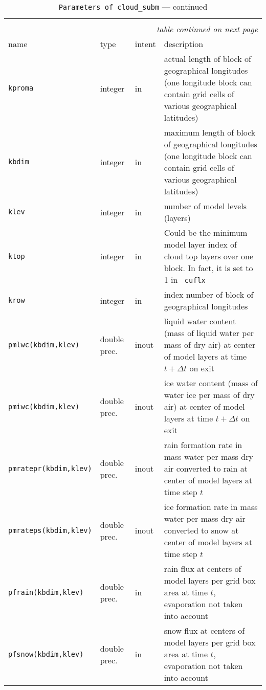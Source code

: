 \begin{longtable}{l@{\extracolsep\fill}llp{7.0cm}}
\hline\hline\caption[Parameters of {\tt cloud\_subm}]{Parameter list
  of arguments passed to {\tt cloud\_subm}}\\\hline\label{tabcloud_subm}
\endfirsthead
\caption[]{{\tt Parameters of {\tt cloud\_subm}} --- continued}\\\hline
\endhead
\hline\multicolumn{4}{r}{\slshape table continued on next page}\\
\endfoot
\hline %
\endlastfoot
name & type & intent & description \\\hline
{\tt kproma} & integer & in & actual length of
block of geographical longitudes (one longitude block can contain grid
cells of various geographical latitudes)\\
{\tt kbdim} &  integer & in & maximum length of block of
geographical longitudes (one longitude block can contain grid cells of
various geographical latitudes)\\
{\tt klev} &  integer & in & number of model levels (layers)\\
{\tt ktop} & integer & in & Could be the minimum model layer index of
cloud top layers over one block. In fact, it is set to 1 in {\tt
  cuflx} \\
{\tt krow} &  integer & in & index number of block of geographical
longitudes\\ 
{\tt pmlwc(kbdim,klev)} & double prec. & inout & liquid water content
(mass of liquid water per mass of dry air)
at center of model layers at time $t+\Delta t$ on exit \\
{\tt pmiwc(kbdim,klev)} & double prec. & inout & ice water content
(mass of water ice per mass of dry air)
at center of model layers at time $t+\Delta t$ on exit \\
{\tt pmratepr(kbdim,klev)} & double prec. & inout & rain formation rate 
in mass water per mass dry air converted to rain at center of model
layers at time step $t$\\
{\tt pmrateps(kbdim,klev)} & double prec. & inout & ice formation rate 
in mass water per mass dry air converted to snow at center of model
layers at time step $t$\\
{\tt pfrain(kbdim,klev)} & double prec. & in & rain flux at centers of
model layers per grid box area at time $t$, evaporation not taken into account \\
{\tt pfsnow(kbdim,klev)} & double prec. & in & snow flux at centers of
model layers per grid box area at time $t$, evaporation not taken into account \\

\end{longtable}
